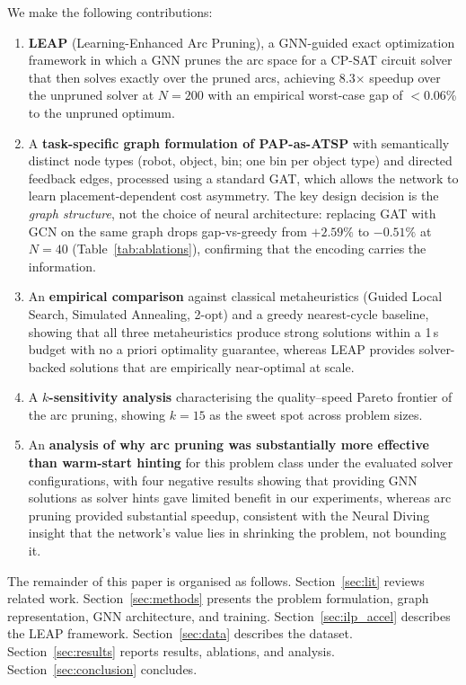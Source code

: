\documentclass[review,times]{elsarticle}
\begin{document}
We make the following contributions:
\begin{enumerate}
    \item \textbf{LEAP} (Learning-Enhanced Arc Pruning), a GNN-guided exact optimization framework in which a GNN prunes the arc space for a CP-SAT circuit solver that then solves exactly over the pruned arcs, achieving 8.3$\times$ speedup over the unpruned solver at $N{=}200$ with an empirical worst-case gap of $<$0.06\% to the unpruned optimum.
    \item A \textbf{task-specific graph formulation of PAP-as-ATSP} with semantically distinct node types (robot, object, bin; one bin per object type) and directed feedback edges, processed using a standard GAT, which allows the network to learn placement-dependent cost asymmetry. The key design decision is the \emph{graph structure}, not the choice of neural architecture: replacing GAT with GCN on the same graph drops gap-vs-greedy from $+2.59\%$ to $-0.51\%$ at $N{=}40$ (Table~\ref{tab:ablations}), confirming that the encoding carries the information.
    \item An \textbf{empirical comparison} against classical metaheuristics (Guided Local Search, Simulated Annealing, 2-opt) and a greedy nearest-cycle baseline, showing that all three metaheuristics produce strong solutions within a 1\,s budget with no a priori optimality guarantee, whereas LEAP provides solver-backed solutions that are empirically near-optimal at scale.
    \item A \textbf{$k$-sensitivity analysis} characterising the quality--speed Pareto frontier of the arc pruning, showing $k{=}15$ as the sweet spot across problem sizes.
    \item An \textbf{analysis of why arc pruning was substantially more effective than warm-start hinting} for this problem class under the evaluated solver configurations, with four negative results showing that providing GNN solutions as solver hints gave limited benefit in our experiments, whereas arc pruning provided substantial speedup, consistent with the Neural Diving insight \cite{nair2021neural} that the network's value lies in shrinking the problem, not bounding it.
\end{enumerate}

The remainder of this paper is organised as follows. Section~\ref{sec:lit} reviews related work. Section~\ref{sec:methods} presents the problem formulation, graph representation, GNN architecture, and training. Section~\ref{sec:ilp_accel} describes the LEAP framework. Section~\ref{sec:data} describes the dataset. Section~\ref{sec:results} reports results, ablations, and analysis. Section~\ref{sec:conclusion} concludes.
\end{document}
